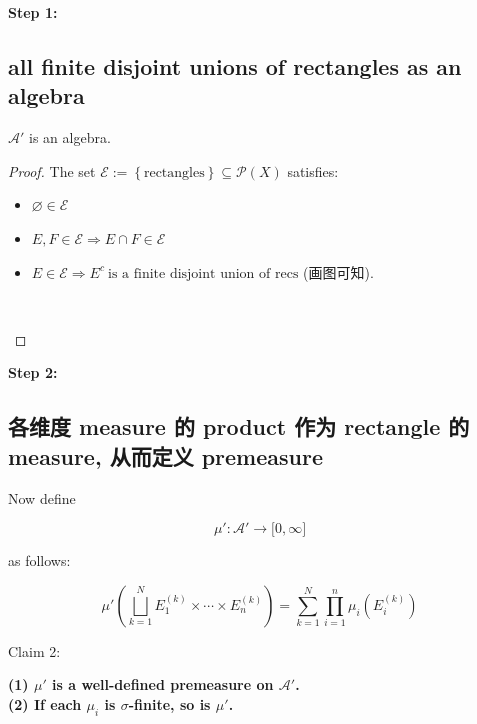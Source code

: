 \textbf{Step 1:}

\subsection{all finite disjoint unions of rectangles as an algebra}\label{all-finite-disjoint-unions-of-rectangles-as-an-algebra}

\begin{proposition}

\(\mathcal{A}'\) is an algebra.

\end{proposition}

\begin{proof}

The set \(\mathcal{E} := \left\{ \text{rectangles} \right\} \subseteq \mathcal{P}(X)\) satisfies:

\begin{itemize}
\item
  \(\varnothing \in \mathcal{E}\)
\item
  \(E,F \in \mathcal{E}\Longrightarrow E \cap F \in \mathcal{E}\)
\item
  \(E \in \mathcal{E}\Longrightarrow E^{c}\ \text{is a finite disjoint union of recs}\) (画图可知).\\
  \strut \\
\end{itemize}

\end{proof}

\textbf{Step 2:}

\subsection{各维度 measure 的 product 作为 rectangle 的 measure, 从而定义 premeasure}\label{ux5404ux7ef4ux5ea6-measure-ux7684-product-ux4f5cux4e3a-rectangle-ux7684-measure-ux4eceux800cux5b9aux4e49-premeasure}

Now define

\[\mu':\mathcal{A}'\rightarrow\lbrack 0,\infty\rbrack\]

as follows:

\[\mu'(\bigsqcup\limits_{k = 1}^{N}E_{1}^{(k)} \times \cdots \times E_{n}^{(k)}) = \sum\limits_{k = 1}^{N}\prod\limits_{i = 1}^{n}\mu_{i}(E_{i}^{(k)})\]

Claim 2:

\begin{proposition}

\textbf{(1) \(\mu'\) is a well-defined premeasure on \(\mathcal{A}'\).\\
(2) If each \(\mu_{i}\) is \(\sigma\)-finite, so is \(\mu'\).}

\end{proposition}

